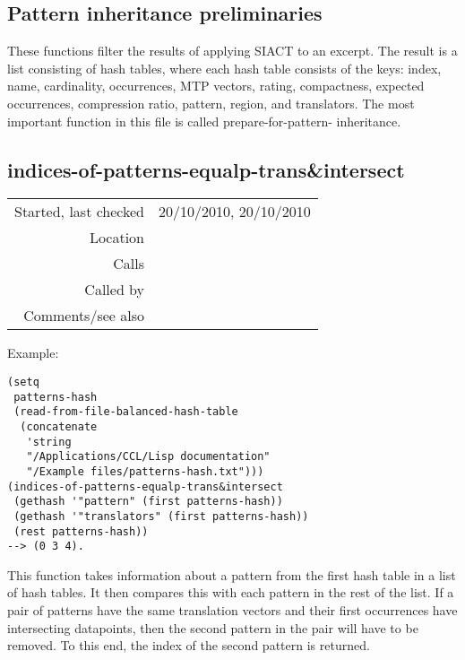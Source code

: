 \subsection{Pattern inheritance preliminaries}\label{sec:pattern-inheritance-preliminaries}

These functions filter the results of
applying SIACT to an excerpt. The result is a list
consisting of hash tables, where each hash table
consists of the keys: index, name, cardinality,
occurrences, MTP vectors, rating, compactness,
expected occurrences, compression ratio, pattern,
region, and translators. The most important function
in this file is called prepare-for-pattern-
inheritance.


\subsection*{indices-of-patterns-equalp-trans\&intersect}\label{fun:indices-of-patterns-equalp-transnintersect}

\vspace{0.3cm}
\begin{tabular}{r|p{8cm}}
Started, last checked & 20/10/2010, 20/10/2010 \\
Location & \nameref{sec:pattern-inheritance-preliminaries} \\
Calls & \nameref{fun:intersection-multidimensional} \\
Called by & \nameref{fun:remove-patterns-equalp-transnintersect} \\
Comments/see also & 
\end{tabular}

\vspace{0.5cm}
\noindent Example:
\begin{verbatim}
(setq
 patterns-hash
 (read-from-file-balanced-hash-table
  (concatenate
   'string
   "/Applications/CCL/Lisp documentation"
   "/Example files/patterns-hash.txt")))
(indices-of-patterns-equalp-trans&intersect
 (gethash '"pattern" (first patterns-hash))
 (gethash '"translators" (first patterns-hash))
 (rest patterns-hash))
--> (0 3 4).
\end{verbatim}

\noindent This function takes information about a
pattern from the first hash table in a list of
hash tables. It then compares this with each
pattern in the rest of the list. If a pair of
patterns have the same translation vectors and
their first occurrences have intersecting
datapoints, then the second pattern in the pair
will have to be removed. To this end, the index of
the second pattern is returned.



